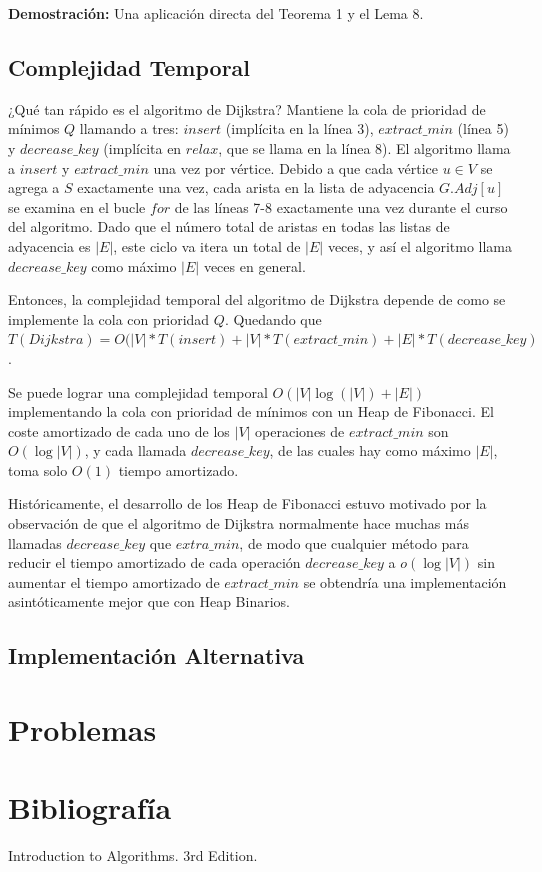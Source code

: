 \documentclass[12pt]{article}
\newcommand{\proof}{\textbf{Demostración:} }
\newcommand{\nl}{\vspace{0.3cm}}
\begin{document}
\proof Una aplicación directa del Teorema 1 y el Lema 8.

\subsection{Complejidad Temporal}

¿Qué tan rápido es el algoritmo de Dijkstra? Mantiene la cola de prioridad de mínimos $Q$ llamando a tres: $insert$ (implícita en la línea 3), $extract\_min$ (línea 5) y $decrease\_key$ (implícita en $relax$, que se llama en la línea 8). El algoritmo llama a $insert$ y $extract\_min$ una vez por vértice. Debido a que cada vértice $u \in V$ se agrega a $S$ exactamente una vez, cada arista en la lista de adyacencia $G.Adj [u]$ se examina en el bucle $for$ de las líneas 7-8 exactamente una vez durante el curso del algoritmo. Dado que el número total de aristas en todas las listas de adyacencia es $|E|$, este ciclo va itera un total de $|E|$ veces, y así el algoritmo llama $decrease\_key$ como máximo $|E|$ veces en general.

\nl

Entonces, la complejidad temporal del algoritmo de Dijkstra depende de como se implemente la cola con prioridad $Q$. Quedando que $T(Dijkstra) = O(|V| * T(insert) + |V| * T(extract\_min) + |E| * T(decrease\_key)$.

\nl

Se puede lograr una complejidad temporal  $O(|V| \log(|V|) + |E|)$ implementando la cola con prioridad de mínimos con un Heap de Fibonacci. El coste amortizado de cada uno de los $|V|$ operaciones de $extract\_min$ son $O(\log|V|)$, y cada llamada $decrease\_key$, de las cuales hay como máximo $|E|$, toma solo $O(1)$ tiempo amortizado.

\nl

Históricamente, el desarrollo de los Heap de Fibonacci estuvo motivado por la observación de que el algoritmo de Dijkstra normalmente hace muchas más llamadas $decrease\_key$ que $extra\_min$, de modo que cualquier método para reducir el tiempo amortizado de cada operación $decrease\_key$ a $o(\log|V|)$ sin aumentar el tiempo amortizado de $extract\_min$ se obtendría una implementación asintóticamente mejor que con Heap Binarios.

\subsection{Implementación Alternativa}



\section{Problemas}

\section{Bibliografía}

Introduction to Algorithms. 3rd Edition.
\end{document}
